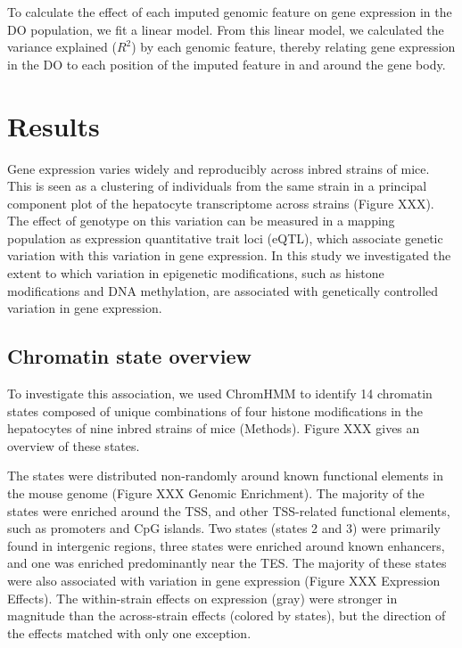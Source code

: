 \documentclass[10pt,letterpaper]{article}
\begin{document}
To calculate the effect of each imputed genomic feature on gene
expression in the DO population, we fit a linear model. From this linear
model, we calculated the variance explained (\(R^2\)) by each genomic
feature, thereby relating gene expression in the DO to each position of
the imputed feature in and around the gene body.

\hypertarget{results}{%
\section{Results}\label{results}}

Gene expression varies widely and reproducibly across inbred strains of
mice. This is seen as a clustering of individuals from the same strain
in a principal component plot of the hepatocyte transcriptome across
strains (Figure XXX). The effect of genotype on this variation can be
measured in a mapping population as expression quantitative trait loci
(eQTL), which associate genetic variation with this variation in gene
expression. In this study we investigated the extent to which variation
in epigenetic modifications, such as histone modifications and DNA
methylation, are associated with genetically controlled variation in
gene expression.

\hypertarget{chromatin-state-overview}{%
\subsection{Chromatin state overview}\label{chromatin-state-overview}}

To investigate this association, we used ChromHMM to identify 14
chromatin states composed of unique combinations of four histone
modifications in the hepatocytes of nine inbred strains of mice
(Methods). Figure XXX gives an overview of these states.

The states were distributed non-randomly around known functional
elements in the mouse genome (Figure XXX Genomic Enrichment). The
majority of the states were enriched around the TSS, and other
TSS-related functional elements, such as promoters and CpG islands. Two
states (states 2 and 3) were primarily found in intergenic regions,
three states were enriched around known enhancers, and one was enriched
predominantly near the TES. The majority of these states were also
associated with variation in gene expression (Figure XXX Expression
Effects). The within-strain effects on expression (gray) were stronger
in magnitude than the across-strain effects (colored by states), but the
direction of the effects matched with only one exception.
\end{document}
